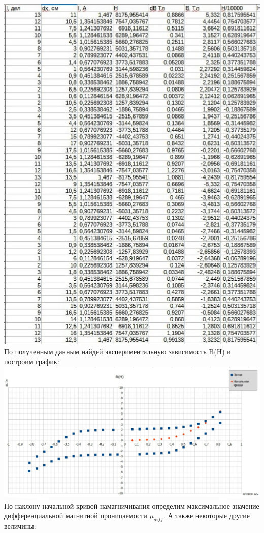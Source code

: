 \documentclass[11pt]{article}
\begin{document}
\includegraphics[width=18cm]{g8}\\
По полученным данным найдей экспериментальную зависимость B(H) и построим график:\\
\includegraphics[width=18cm]{g5}\\
По наклону начальной кривой намагничивания определим максимальное значение дифференциальной магнитной проницаемости $\mu_{diff}$. А также некоторые другие величины:\\
\end{document}
